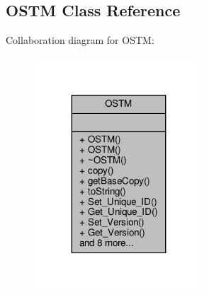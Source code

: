 \hypertarget{class_o_s_t_m}{}\subsection{O\+S\+TM Class Reference}
\label{class_o_s_t_m}


Collaboration diagram for O\+S\+TM\+:\nopagebreak
\begin{figure}[H]
\begin{center}
\leavevmode
\includegraphics[width=179pt]{class_o_s_t_m__coll__graph}
\end{center}
\end{figure}
